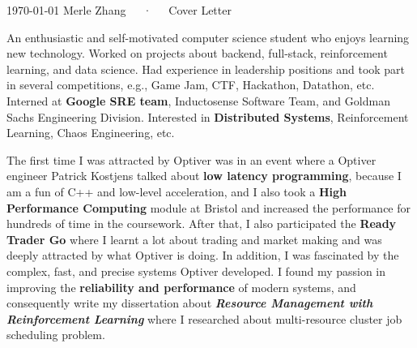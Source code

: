 \documentclass[11pt, a4paper]{awesome-cv}
\begin{document}
\makecvheader[C]

\makecvfooter
  {\today}
  {Merle Zhang~~~·~~~Cover Letter}
  {}

\makelettertitle

\begin{cvletter}

An enthusiastic and self-motivated computer science student who enjoys learning new technology. 
Worked on projects about backend, full-stack, reinforcement learning, and data science. Had experience in leadership positions and took part in several competitions, e.g., Game Jam, CTF, Hackathon, Datathon, etc. Interned at \textbf{Google SRE team}, Inductosense Software Team, and Goldman Sachs Engineering Division. Interested in \textbf{Distributed Systems}, Reinforcement Learning, Chaos Engineering, etc.

The first time I was attracted by Optiver was in an event where a Optiver engineer Patrick Kostjens talked about \textbf{low latency programming}, because I am a fun of C++ and low-level acceleration, and I also took a \textbf{High Performance Computing} module at Bristol and increased the performance for hundreds of time in the coursework. After that, I also participated the \textbf{Ready Trader Go} where I learnt a lot about trading and market making and was deeply attracted by what Optiver is doing. In addition, I was fascinated by the complex, fast, and precise systems Optiver developed. I found my passion in improving the \textbf{reliability and performance} of modern systems, and consequently write my dissertation about \textbf{\textit{Resource Management with Reinforcement Learning}} where I researched about multi-resource cluster job scheduling problem.


\end{cvletter}
\end{document}
